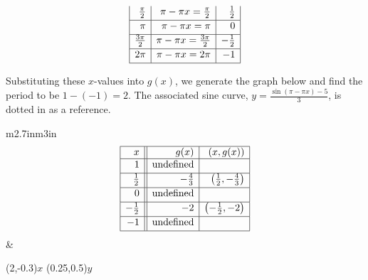 \begin{ex}
\begin{enumerate}
\[\begin{array}{|r|r|r|}
\frac{\pi}{2}  & \pi - \pi x = \frac{\pi}{2} & \frac{1}{2} \\ [2pt] \hline 

\pi &  \pi - \pi x = \pi & 0 \\ [2pt] \hline 

\frac{3\pi}{2}  &  \pi - \pi x = \frac{3\pi}{2} & -\frac{1}{2} \\ [2pt] \hline 

2\pi  & \pi - \pi x = 2\pi & -1 \\  [2pt] \hline
\end{array} \]
\setlength{\extrarowheight}{0pt}

Substituting these $x$-values into $g(x)$, we generate the graph below and find the period to be $1 - (-1) = 2$.   The associated sine curve, $y = \frac{\sin(\pi - \pi x) - 5}{3}$, is dotted in as a reference.  

\hspace{.25in} \begin{tabular}{m{2.7in}m{3in}}
\setlength{\extrarowheight}{2pt}
\[ \begin{array}{|r||r|r|}  

\hline

 x & g(x) & (x,g(x))  \\ \hline
1  & \text{undefined} &   \\ [2pt]   \hline
\frac{1}{2}  & -\frac{4}{3} &  \left(\frac{1}{2}, -\frac{4}{3} \right)  \\ [2pt] \hline 
0 & \text{undefined} &   \\ [2pt] \hline 
-\frac{1}{2} & -2 & \left(-\frac{1}{2}, -2\right)  \\ [2pt] \hline 
-1 & \text{undefined} &    \\ [2pt] \hline 
\end{array} \] \setlength{\extrarowheight}{0pt} &

\begin{mfpic}[30]{-2}{2}{-3}{0.5}
\axes
\tlabel[cc](2,-0.3){\scriptsize $x$}
\tlabel[cc](0.25,0.5){\scriptsize $y$}
\tlpointsep{4pt}
\dotted {}
\dashed {}
\dashed {}
\arrow \reverse \arrow {}
\arrow \reverse \arrow {}
\end{mfpic} \\


\end{tabular}
\end{enumerate}
\end{ex}
